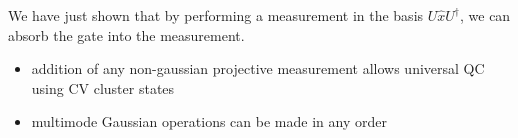 \documentclass[pra,
superscriptaddress,
 amsmath,amssymb,
 aps,twocolumn]{revtex4-1}
\begin{document}
We have just shown that 
by performing a measurement in the basis $U\hat x U^\dagger$, we can absorb the gate into the measurement. 

\begin{itemize}
	\item addition of any non-gaussian projective measurement allows universal QC using CV cluster states
	\item multimode Gaussian operations can be made in any order
\end{itemize}


\end{document}
